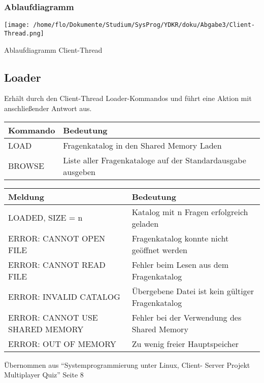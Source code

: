 \documentclass[a4paper,10pt]{article}
\begin{document}
\subsubsection{Ablaufdiagramm}
\begin{center}
 \texttt{[image: /home/flo/Dokumente/Studium/SysProg/YDKR/doku/Abgabe3/Client-Thread.png]}
\end{center}
Ablaufdiagramm Client-Thread

\subsection{Loader}

Erhält durch den Client-Thread Loader-Kommandos und führt eine Aktion mit anschließender Antwort aus.

\begin{center}
\begin{tabular}{|l|l|}\hline
\textbf{Kommando} & \textbf{Bedeutung}\\\hline
LOAD & Fragenkatalog in den Shared Memory Laden\\\hline
BROWSE & Liste aller Fragenkataloge auf der Standardausgabe ausgeben\\\hline
\end{tabular}
\end{center}

\begin{center}
\begin{tabular}{|l|l|}\hline
\textbf{Meldung} & \textbf{Bedeutung}\\\hline
LOADED, SIZE = n & Katalog mit n Fragen erfolgreich geladen\\\hline
ERROR: CANNOT OPEN FILE & Fragenkatalog konnte nicht geöffnet werden\\\hline
ERROR: CANNOT READ FILE & Fehler beim Lesen aus dem Fragenkatalog\\\hline
ERROR: INVALID CATALOG & Übergebene Datei ist kein gültiger Fragenkatalog\\\hline
ERROR: CANNOT USE SHARED MEMORY & Fehler bei der Verwendung des Shared Memory\\\hline
ERROR: OUT OF MEMORY & Zu wenig freier Hauptspeicher\\\hline
\end{tabular}
\end{center}

$~~$\\Übernommen aus “Systemprogrammierung unter Linux, Client- Server Projekt Multiplayer Quiz” Seite 8
\end{document}
